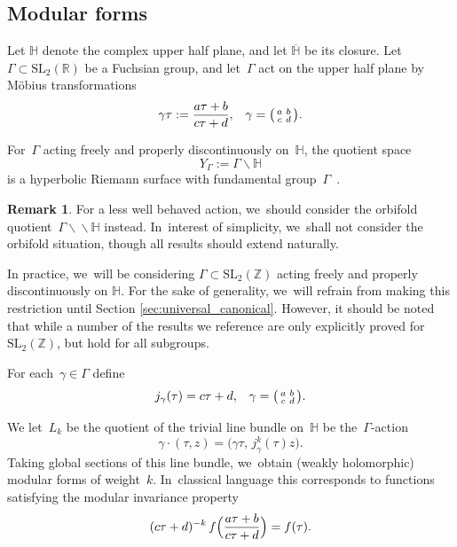 \documentclass[10pt,a4paper]{article}
\numberwithin{equation}{section}
\theoremstyle{plain}
\theoremstyle{definition}
\newtheorem{remark}[theoremcounter]{Remark}
\newcommand{\tx}{\text}
\newcommand{\nbd}{\nobreakdash-\hspace{0pt}}
\newcommand{\bbR}{\ensuremath{\mathbb{R}}}
\newcommand{\bbZ}{\ensuremath{\mathbb{Z}}}
\let\ov\overline
\newenvironment{psmatrix}{\bigl(\begin{smallmatrix}}{\end{smallmatrix}\bigr)}
\newcommand{\SL}[1]{\ensuremath{\mathrm{SL}_{#1}}}
\newcommand{\HS}{\ensuremath{\mathbb{H}}}
\let\Ga\Gamma
\let\ga\gamma
\begin{document}
\subsection{Modular forms}
\label{ssec:modular_curves}

Let $\HS$ denote the complex upper half plane, and let $\ov{\HS}$ be its closure. Let~$\Ga\subset \SL2(\bbR)$ be a Fuchsian group, and let~$\Ga$ act on the upper half plane by Möbius transformations
\begin{equation*}
\gamma\tau
:=
\frac{a\tau +b}{c\tau + d}
\tx{,}\quad
\ga = \begin{psmatrix} a & b \\ c& d \end{psmatrix}
\tx{.}
\end{equation*}

For~$\Ga$ acting freely and properly discontinuously on~$\HS$, the quotient space
\begin{equation*}
Y_\Ga := \Ga\backslash\HS
\end{equation*}
is a hyperbolic Riemann surface with fundamental group~$\Ga$~\cite{Miyake1989}.

\begin{remark}
For a less well behaved action, we~should consider the orbifold quotient~$\Ga\backslash\!\!\backslash\HS$ instead. In~interest of simplicity, we~shall not consider the orbifold situation, though all results should extend naturally.

In practice, we~will be considering $\Ga\subset\SL2(\bbZ)$ acting freely and properly discontinuously on $\HS$. For the sake of generality, we~will refrain from making this restriction until Section \ref{sec:universal_canonical}. However, it should be noted that while a number of the results we reference are only explicitly proved for $\SL2(\bbZ)$, but hold for all subgroups.
\end{remark}

For each~$\ga\in\Ga$ define
\begin{equation*}
j_\ga(\tau)
=
c \tau + d
\tx{,}\quad
\ga = \begin{psmatrix} a & b \\ c & d \end{psmatrix}
\tx{.}
\end{equation*}

We let~$L_k$ be the quotient of the trivial line bundle on~$\HS$ be the~$\Ga$\nbd{}action
\begin{equation*}
\gamma\cdot(\tau,z)
=
\bigl(\gamma\tau,\, j_\ga^k(\tau)z \bigr)
\tx{.}
\end{equation*}
Taking global sections of this line bundle, we~obtain (weakly holomorphic) modular forms of weight~$k$. In~classical language this corresponds to functions satisfying the modular invariance property
\begin{equation*}
(c \tau + d)^{-k}\,
f\Bigl(\frac{a \tau + b}{c \tau + d} \Bigr)
=
f(\tau)
\tx{.}
\end{equation*}
\end{document}

